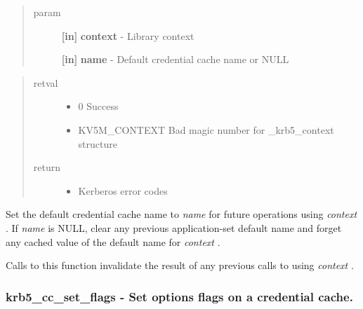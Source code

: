 \documentclass[letterpaper,10pt,english]{sphinxmanual}
\begin{document}
\begin{fulllineitems}
\label{appdev/refs/api/krb5_cc_set_default_name:krb5_cc_set_default_name}
\end{fulllineitems}

\begin{quote}\begin{description}
\item[{param}] \leavevmode
\textbf{{[}in{]}} \textbf{context} - Library context

\textbf{{[}in{]}} \textbf{name} - Default credential cache name or NULL

\end{description}\end{quote}
\begin{quote}\begin{description}
\item[{retval}] \leavevmode\begin{itemize}
\item {} 
0   Success

\item {} 
KV5M\_CONTEXT   Bad magic number for \_krb5\_context structure

\end{itemize}

\item[{return}] \leavevmode\begin{itemize}
\item {} 
Kerberos error codes

\end{itemize}

\end{description}\end{quote}

Set the default credential cache name to \emph{name} for future operations using \emph{context} . If \emph{name} is NULL, clear any previous application-set default name and forget any cached value of the default name for \emph{context} .

Calls to this function invalidate the result of any previous calls to {\hyperref[appdev/refs/api/krb5_cc_default_name:krb5_cc_default_name]{}} using \emph{context} .


\subsubsection{krb5\_cc\_set\_flags -  Set options flags on a credential cache.}
\label{appdev/refs/api/krb5_cc_set_flags:krb5-cc-set-flags-set-options-flags-on-a-credential-cache}\label{appdev/refs/api/krb5_cc_set_flags::doc}
\end{document}
